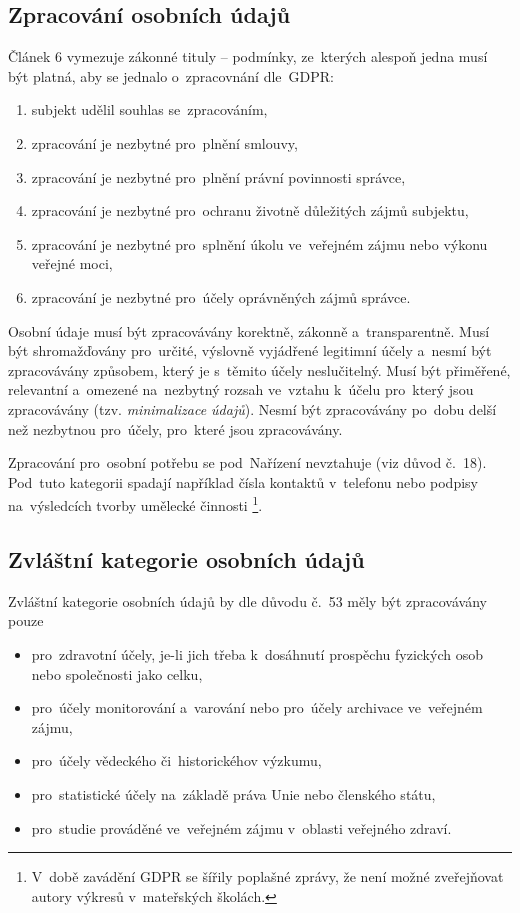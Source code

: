 \subsection{Zpracování osobních údajů}

Článek 6 vymezuje zákonné tituly -- podmínky, ze~kterých alespoň jedna musí být platná, aby se jednalo o~zpracovnání dle~GDPR:

\begin{enumerate}[label=\alph*)]
\item subjekt udělil souhlas se~zpracováním,
\item zpracování je nezbytné pro~plnění smlouvy,
\item zpracování je nezbytné pro~plnění právní povinnosti správce,
\item zpracování je nezbytné pro~ochranu životně důležitých zájmů subjektu,
\item zpracování je nezbytné pro~splnění úkolu ve~veřejném zájmu nebo výkonu veřejné moci,
\item zpracování je nezbytné pro~účely oprávněných zájmů správce.
\end{enumerate}

Osobní údaje musí být zpracovávány korektně, zákonně a~transparentně.
Musí být shromažďovány pro~určité, výslovně vyjádřené legitimní účely a~nesmí být zpracovávány způsobem, který je s~těmito účely neslučitelný.
Musí být přiměřené, relevantní a~omezené na~nezbytný rozsah ve~vztahu k~účelu pro~který jsou zpracovávány (tzv. \emph{minimalizace údajů}).
Nesmí být zpracovávány po~dobu delší než nezbytnou pro~účely, pro~které jsou zpracovávány.

Zpracování pro~osobní potřebu se pod~Nařízení nevztahuje (viz důvod č.~18).
Pod~tuto kategorii spadají například čísla kontaktů v~telefonu nebo podpisy na~výsledcích tvorby umělecké činnosti%
\footnote{V~době zavádění GDPR se šířily poplašné zprávy, že není možné zveřejňovat autory výkresů v~mateřských školách.}.

\subsection{Zvláštní kategorie osobních údajů}

Zvláštní kategorie osobních údajů by dle důvodu č.~53 měly být zpracovávány pouze

\begin{itemize}
\item pro~zdravotní účely, je-li jich třeba k~dosáhnutí prospěchu fyzických osob nebo společnosti jako celku,
\item pro~účely monitorování a~varování nebo pro~účely archivace ve~veřejném zájmu,
\item pro~účely vědeckého či~historickéhov výzkumu,
\item pro~statistické účely na~základě práva Unie nebo členského státu,
\item pro~studie prováděné ve~veřejném zájmu v~oblasti veřejného zdraví.
\end{itemize}

